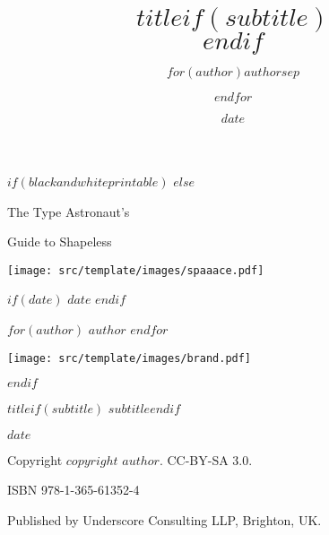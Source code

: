 \documentclass[$if(fontsize)$$fontsize$$else$12pt$endif$,$if(lang)$$lang$,$endif$$if(papersize)$$papersize$,$endif$$for(classoption)$$classoption$$sep$,$endfor$]{$documentclass$}
\title{$title$$if(subtitle)$\\\vspace{0.5em}{\large $subtitle$}$endif$}
\author{$for(author)$$author$$sep$ \and $endfor$}
\date{$date$}
\newenvironment{bottompar}{\par\vspace*{\fill}}{\clearpage}
\begin{document}
\frontmatter
\pagestyle{empty}
\pagecolor{white}


$if(blackandwhiteprintable)$
$else$
\begin{titlepage}

\begin{center}

{\fontsize{1cm}{1em} \color{titlecolor} \textsf{The Type Astronaut's}}

\vspace{.5em}

{\fontsize{1.3cm}{1em} \color{titlecolor} \textsf{Guide to Shapeless}}

\vspace{4em}

\texttt{[image: src/template/images/spaaace.pdf]}

\begin{bottompar}
\begin{center}
$if(date)$
{\fontsize{.5cm}{1em} \color{brandcolor} \textsf{$date$}}
$endif$

\vspace{1em}

$for(author)$
{\fontsize{.6cm}{1em} \color{brandcolor} \textsf{$author$}}
$endfor$

\vspace{1em}

\texttt{[image: src/template/images/brand.pdf]}

\end{center}
\end{bottompar}

\end{center}
\end{titlepage}


\pagecolor{white}
$endif$


\vspace*{\fill}

\begin{center}

{\Large $title$$if(subtitle)$ $subtitle$$endif$}

$date$

Copyright $copyright$ $author$. CC-BY-SA 3.0.

ISBN 978-1-365-61352-4

Published by Underscore Consulting LLP, Brighton, UK.

\end{center}
\end{document}
